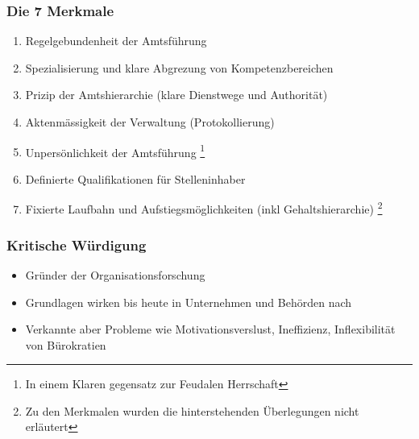 \subsubsection{Die 7 Merkmale}
\begin{enumerate}
    \item Regelgebundenheit der Amtsführung
    \item Spezialisierung und klare Abgrezung von Kompetenzbereichen
    \item Prizip der Amtshierarchie (klare Dienstwege und Authorität)
    \item Aktenmässigkeit der Verwaltung (Protokollierung)
    \item Unpersönlichkeit der Amtsführung \footnote{In einem Klaren gegensatz zur Feudalen Herrschaft}
    \item Definierte Qualifikationen für Stelleninhaber
    \item Fixierte Laufbahn und Aufstiegsmöglichkeiten (inkl Gehaltshierarchie) \footnote{Zu den Merkmalen wurden die hinterstehenden Überlegungen nicht erläutert }
\end{enumerate}
\subsubsection{Kritische Würdigung}
\begin{itemize}
    \item Gründer der Organisationsforschung
    \item Grundlagen wirken bis heute in Unternehmen und Behörden nach
    \item Verkannte aber Probleme wie Motivationsverslust, Ineffizienz, Inflexibilität von Bürokratien
\end{itemize}
